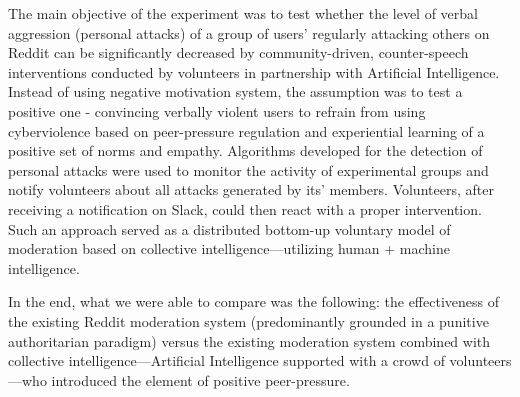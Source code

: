 \documentclass[
  10pt,
  dvipsnames,enabledeprecatedfontcommands]{scrartcl}
\begin{document}
The main objective of the experiment was to test whether the level of
verbal aggression (personal attacks) of a group of users' regularly
attacking others on Reddit can be significantly decreased by
community-driven, counter-speech interventions conducted by volunteers
in partnership with Artificial Intelligence. Instead of using negative
motivation system, the assumption was to test a positive one -
convincing verbally violent users to refrain from using cyberviolence
based on peer-pressure regulation and experiential learning of a
positive set of norms and empathy. Algorithms developed for the
detection of personal attacks were used to monitor the activity of
experimental groups and notify volunteers about all attacks generated by
its' members. Volunteers, after receiving a notification on Slack, could
then react with a proper intervention. Such an approach served as a
distributed bottom-up voluntary model of moderation based on collective
intelligence---utilizing human + machine intelligence.

In the end, what we were able to compare was the following: the
effectiveness of the existing Reddit moderation system (predominantly
grounded in a punitive authoritarian paradigm) versus the existing
moderation system combined with collective intelligence---Artificial
Intelligence supported with a crowd of volunteers---who introduced the
element of positive peer-pressure.
\end{document}
